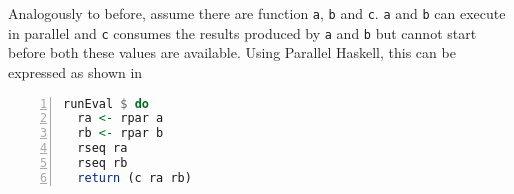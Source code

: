 Analogously to before, assume there are function \texttt{a}, \texttt{b} and \texttt{c}. \texttt{a} and \texttt{b} can execute in parallel and \texttt{c} consumes the results produced by \texttt{a} and \texttt{b} but cannot start before both these values are available. Using \textsf{Parallel Haskell}, this can be expressed as shown in 
\begin{lstlisting}[language=Haskell, numbers=left, frame=bt, label=lst:example_parallel_haskell, caption={Parallel and sequential composition in \textsf{Parallel Haskell}.}]
runEval $ do
  ra <- rpar a
  rb <- rpar b
  rseq ra
  rseq rb
  return (c ra rb)
\end{lstlisting}